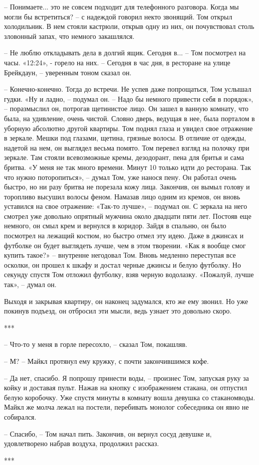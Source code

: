 – Понимаете... это не совсем подходит для телефонного разговора. Когда мы могли бы встретиться? – с надеждой говорил некто звонящий. Том открыл холодильник. В нем стояли кастрюли, открыв одну из них, он почувствовал столь зловонный запах, что немного закашлялся. 
      
– Не люблю откладывать дела в долгий ящик. Сегодня в... – Том посмотрел на часы. «12:24», - горело на них. – Сегодня в час дня, в ресторане на улице Брейкдаун, – уверенным тоном сказал он.
      
– Конечно-конечно. Тогда до встречи.
Не успев даже попрощаться, Том услышал гудки. «Ну и ладно, – подумал он. – Надо бы немного привести себя в порядок», – поразмыслил он, потрогав щетинистое лицо. Он зашел в ванную комнату, что была, на удивление, очень чистой. Словно дверь, ведущая в нее, была порталом в уборную абсолютно другой квартиры. Том поднял глаза и увидел свое отражение в зеркале. Мешки под глазами, щетина, грязные волосы. В отличие от одежды, надетой на нем, он выглядел весьма помято. Том перевел взгляд на полочку при зеркале. Там стояли всевозможные кремы, дезодорант, пена для бритья и сама бритва. «У меня не так много времени. Минут 10 только идти до ресторана. Так что нужно поторопиться», – думал Том, уже нанося пену. Он работал очень быстро, но ни разу бритва не порезала кожу лица. Закончив, он вымыл голову и торопливо высушил волосы феном. Намазав лицо одним из кремов, он вновь уставился на свое отражение: «Так-то лучше», – подумал он. С зеркала на него смотрел уже довольно опрятный мужчина около двадцати пяти лет. Постояв еще немного, он смыл крем и вернулся в коридор. Зайдя в спальню, он было посмотрел на лежащий костюм, но быстро отмел эту идею. Даже в джинсах и футболке он будет выглядеть лучше, чем в этом творении. «Как я вообще смог купить такое?» – внутренне негодовал Том. Вновь медленно переступая все осколки, он прошел к шкафу и достал черные джинсы и белую футболку. Но секунду спустя Том отложил футболку, взяв черную водолазку. «Пожалуй, лучше так», – думал он.

Выходя и закрывая квартиру, он наконец задумался, кто же ему звонил. Но уже покинув подъезд, он отбросил эти мысли, ведь узнает это довольно скоро. 

\begin{center}***\end{center}

– Что-то у меня в горле пересохло, – сказал Том, покашляв.

– М? – Майкл протянул ему кружку, с почти закончившимся кофе.

– Да нет, спасибо. Я попрошу принести воды, – произнес Том, запуская руку за койку и доставая пульт. Нажав на кнопку с изображением стакана, он отпустил белую коробочку. Уже спустя минуты в комнату вошла девушка со стаканомводы. Майкл же молча лежал на постели, перебивать монолог собеседника он явно не собирался. 

– Спасибо, – Том начал пить. Закончив, он вернул сосуд девушке и, удовлетворено набрав воздуха, продолжил рассказ.

\begin{center}***\end{center}
\clearpage
{\begingroup
{}
\noindent
\endgroup}
\cleardoublepage
